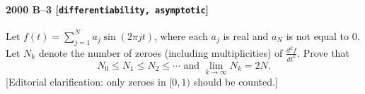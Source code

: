 \paragraph{2000 B--3 \textnormal{[\texttt{differentiability, asymptotic}]}}
Let $f(t)=\sum_{j=1}^N a_j \sin(2\pi jt)$, where each $a_j$ is real
and
$a_N$ is not equal to 0. Let $N_k$ denote the number of zeroes (including
multiplicities) of $\frac{d^k f}{dt^k}$.
Prove that
\[N_0\leq N_1\leq N_2\leq \cdots \mbox{ and } \lim_{k\to\infty} N_k = 2N.\]
[Editorial clarification: only zeroes in $[0, 1)$ should be counted.]
